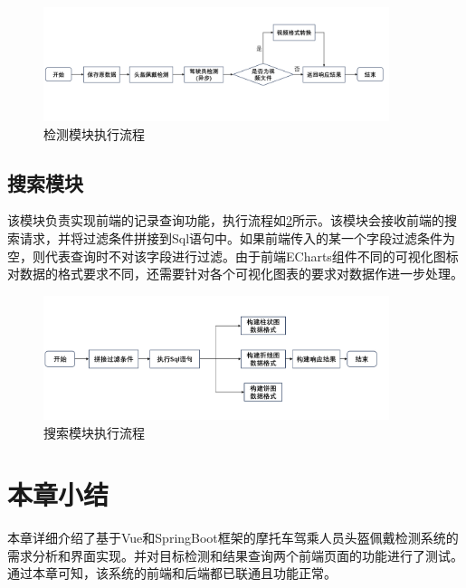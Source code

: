 \begin{figure}[!htb]
    \centering
    \includegraphics[width=0.9\textwidth]{figs/chap05/process1.png}
    \caption{检测模块执行流程}
    \label{fig:process1}
\end{figure}


\subsection{搜索模块}
该模块负责实现前端的记录查询功能，执行流程如\ref{fig:process2}所示。该模块会接收前端的搜索请求，并将过滤条件拼接到Sql语句中。如果前端传入的某一个字段过滤条件为空，则代表查询时不对该字段进行过滤。由于前端ECharts组件不同的可视化图标对数据的格式要求不同，还需要针对各个可视化图表的要求对数据作进一步处理。

\begin{figure}[!htb]
    \centering
    \includegraphics[width=0.9\textwidth]{figs/chap05/process2.png}
    \caption{搜索模块执行流程}
    \label{fig:process2}
\end{figure}

\section{本章小结}
本章详细介绍了基于Vue和SpringBoot框架的摩托车驾乘人员头盔佩戴检测系统的需求分析和界面实现。并对目标检测和结果查询两个前端页面的功能进行了测试。通过本章可知，该系统的前端和后端都已联通且功能正常。


